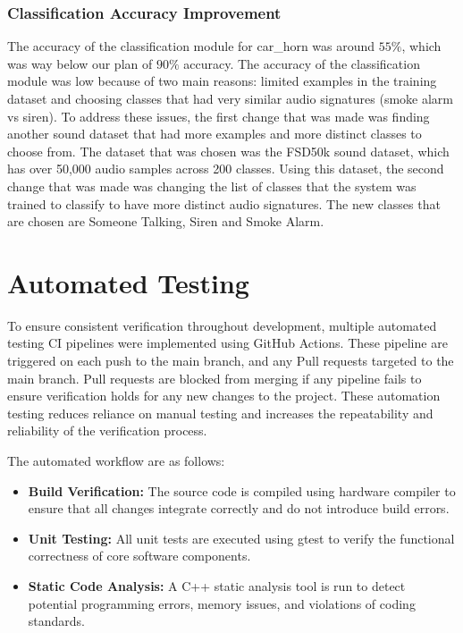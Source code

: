 \documentclass[12pt, titlepage]{article}
\begin{document}
\subsubsection{Classification Accuracy Improvement}
The accuracy of the classification module for car\_horn was around $55\%$, which 
was way below our plan of $90\%$ accuracy. The accuracy of the classification 
module was low because of two main reasons: limited examples in the training 
dataset and choosing classes that had very similar audio signatures (smoke 
alarm vs siren). To address these issues, the first change that was made was 
finding another sound dataset that had more examples and more distinct classes 
to choose from. The dataset that was chosen was the FSD50k sound dataset, which 
has over 50,000 audio samples across 200 classes\cite{FSD50k}. Using this 
dataset, the second change that was made was changing the list of classes that 
the system was trained to classify to have more distinct audio signatures. The 
new classes that are chosen are Someone Talking, Siren and Smoke Alarm. 

\section{Automated Testing}

To ensure consistent verification throughout development, multiple automated
testing CI pipelines were implemented using GitHub Actions. These pipeline are
triggered on each push to the main branch, and any Pull requests targeted to the
main branch. Pull requests are blocked from merging if any pipeline fails to
ensure verification holds for any new changes to the project. These automation
testing reduces reliance on manual testing and increases the repeatability and
reliability of the verification process.

The automated workflow are as follows:

\begin{itemize}
  \item \textbf{Build Verification:} The source code is compiled using hardware
    compiler to ensure that all changes integrate correctly and do not introduce
    build errors.

  \item \textbf{Unit Testing:} All unit tests are executed using gtest
    \cite{GoogleTest} to verify the functional correctness of core software
    components.
  \item \textbf{Static Code Analysis:} A C++ static analysis tool
    \cite{clangStaticAnalyzer} is run to detect potential programming errors,
    memory issues, and violations of coding standards.
\end{itemize}
\end{document}
